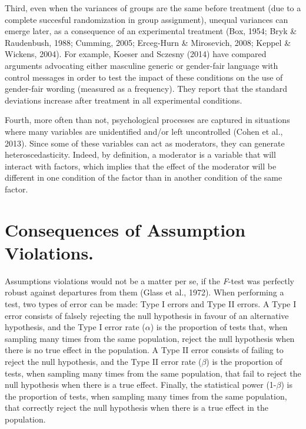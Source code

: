 \documentclass[man,floatsintext]{apa6}
\begin{document}
Third, even when the variances of groups are the same before treatment (due to a complete succesful randomization in group assignment), unequal variances can emerge later, as a consequence of an experimental treatment (Box, 1954; Bryk \& Raudenbush, 1988; Cumming, 2005; Erceg-Hurn \& Mirosevich, 2008; Keppel \& Wickens, 2004). For example, Koeser and Sczesny (2014) have compared arguments advocating either masculine generic or gender-fair language with control messages in order to test the impact of these conditions on the use of gender-fair wording (measured as a frequency). They report that the standard deviations increase after treatment in all experimental conditions.

Fourth, more often than not, psychological processes are captured in situations where many variables are unidentified and/or left uncontrolled (Cohen et al., 2013). Since some of these variables can act as moderators, they can generate heteroscedasticity. Indeed, by definition, a moderator is a variable that will interact with factors, which implies that the effect of the moderator will be different in one condition of the factor than in another condition of the same factor.

\hypertarget{consequences-of-assumption-violations.}{%
\section{Consequences of Assumption Violations.}\label{consequences-of-assumption-violations.}}

Assumptions violations would not be a matter per se, if the \emph{F}-test was perfectly robust against departures from them (Glass et al., 1972). When performing a test, two types of error can be made: Type I errors and Type II errors. A Type I error consists of falsely rejecting the null hypothesis in favour of an alternative hypothesis, and the Type I error rate (\(\alpha\)) is the proportion of tests that, when sampling many times from the same population, reject the null hypothesis when there is no true effect in the population. A Type II error consists of failing to reject the null hypothesis, and the Type II error rate (\(\beta\)) is the proportion of tests, when sampling many times from the same population, that fail to reject the null hypothesis when there is a true effect. Finally, the statistical power (1-\(\beta\)) is the proportion of tests, when sampling many times from the same population, that correctly reject the null hypothesis when there is a true effect in the population.
\end{document}
